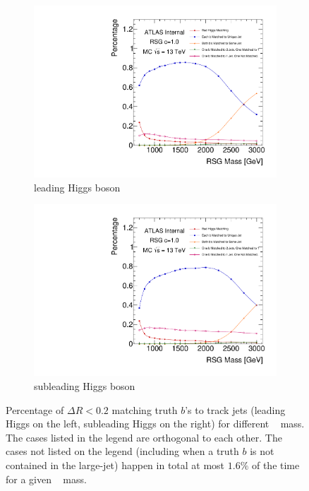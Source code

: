 \begin{figure}[htbp!]
    \captionsetup{justification=centering}
    \begin{subfigure}[b]{0.45\textwidth}
        \includegraphics[width=\textwidth,angle=-90]{figures/boosted/Truth/truth_b-matching.pdf}
        \caption{leading Higgs boson}
        \label{fig:truth-bmatch-lead}
    \end{subfigure}
    \quad
    \begin{subfigure}[b]{0.45\textwidth}
        \includegraphics[width=\textwidth,angle=-90]{figures/boosted/Truth/truth_b-matching-sublead.pdf}
        \caption{subleading Higgs boson}
        \label{fig:truth-bmatch-subl}
    \end{subfigure}
\caption{Percentage of $\Delta R<0.2$ matching truth $b$'s to track jets (leading Higgs on the left, subleading Higgs on the right) for different \Grav~ mass. The cases listed in the legend are orthogonal to each other. The cases not listed on the legend (including when a truth $b$ is not contained in the large-\R jet) happen in total at most $1.6\%$ of the time for a given \Grav~ mass.}
\label{fig:truth-bmatch}
\end{figure}


